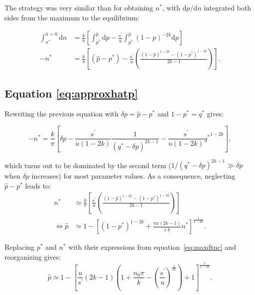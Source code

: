 \documentclass[10pt,a4paper]{article}
\begin{document}
\begin{appendices}
The strategy was very similar than for obtaining $n^\ast$, with $\mathrm d p / \mathrm d n$ integrated both sides from the maximum to the equilibrium:

\begin{equation*}
\begin{split}
	\int_{n^\ast}^{\hat n = 0} \mathrm d n &=  \frac{k}{\pi} \left[ \int_{p^\ast}^{\hat p} \mathrm d p - \frac{s^\prime}{u} \int_{p^\ast}^{\hat p} (1-p)^{-2k} \mathrm d p \right] \\
	-n^\ast &= \frac{k}{\pi}\left[(\hat p - p^\ast) - \frac{s^\prime}{u} \left( \frac{(1-\hat p)^{1-2k} - (1-p^\ast)^{1-2k}}{2k-1}\right)\right].
\end{split}
\end{equation*}

\subsection{\label{app:approxhatp} Equation \ref{eq:approxhatp}}

Rewriting the previous equation with $\delta p = \hat p - p^\ast$ and $1-p^\ast = q^\ast$ gives:

\begin{equation*}
	-n^\ast = \frac{k}{\pi}\left[\delta p - \frac{s^\prime}{u(1-2k)} \frac{1}{(q^\ast - \delta p)^{2k-1}} - \frac{s^\prime}{u(1-2k)} {q^\ast}^{1-2k}\right],
\end{equation*}

\noindent which turns out to be dominated by the second term ($ 1/(q^\ast - \delta p)^{2k-1} \gg \delta p$ when $\delta p$ increases) for most parameter values. As a consequence, neglecting $\hat p - p^\ast$ leads to:
\begin{equation*}
\begin{split}
	n^\ast &\simeq \frac{k}{\pi}\left[\frac{s^\prime}{u} \left( \frac{(1-\hat p)^{1-2k} - (1-p^\ast)^{1-2k}}{2k-1}\right)\right] \\
	\Longleftrightarrow \hat p &\simeq 1- \left[ (1-p^\ast)^{1-2k} + \frac{\pi u (2k-1)}{s^\prime k} n^\ast \right]^\frac{1}{1-2k}.
\end{split}
\end{equation*} 

Replacing $p^\ast$ and $n^\ast$ with their expressions from equation~\ref{eq:maxdtnc} and reorganizing gives:
\begin{equation*}
		\hat p \simeq 1-\left[\frac{u}{s^\prime}(2k-1)(1+\frac{n_0 \pi}{k}-\left(\frac{s^\prime}{u}\right)^\frac{1}{2k})+1\right]^\frac{1}{1-2k}.
\end{equation*}


\end{appendices}
\end{document}
